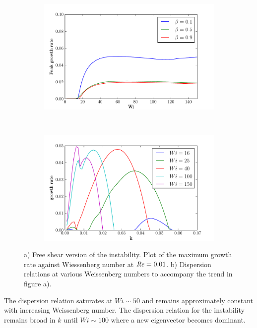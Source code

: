 \documentclass{jfm}
\newcommand\Rey{\mbox{\textit{Re}}}  %
\begin{document}
\begin{figure}
    \centering
    \begin{subfigure}[b]{0.48\textwidth}
	\centering
	\includegraphics[width=\textwidth]{inf_purely_elastic}
	\caption{}
	\label{fig:inf_low_Re}
    \end{subfigure}
    ~
    \begin{subfigure}[b]{0.48\textwidth}
	\centering
	\includegraphics[width=\textwidth]{inf_dispersions_low_Re}
	\caption{}
	\label{fig:dispersions_low_Re}
    \end{subfigure}
    \caption{a) Free shear version of the instability. Plot of the maximum
	     growth rate against Wiessenberg number at $\Rey = 0.01$. b)
	     Dispersion relations at various Weissenberg numbers to accompany
	     the trend in figure a).}
\end{figure}

The dispersion relation saturates at $Wi \sim 50$ and remains approximately
constant with increasing Weissenberg number. The dispersion relation for the
instability remains broad in $k$ until $Wi \sim 100$ where a new eigenvector
becomes dominant.
\end{document}
